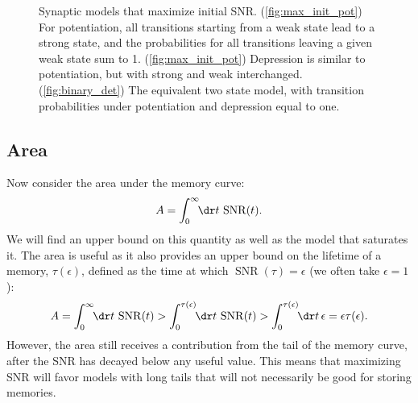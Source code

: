 \documentclass{article} %
\DeclareMathOperator{\snr}{SNR}
\begin{document}
\begin{figure}[tbp]
 \begin{center}
 \begin{myenuma}
  \item\hp{}\label{fig:max_init_pot}\hp
  \item{}\label{fig:max_init_dep}\hp
  \item\hp{}\label{fig:binary_det}
  \end{myenuma}
 \end{center}
  \caption{Synaptic models that maximize initial SNR.
  (\ref{fig:max_init_pot}) For potentiation, all transitions starting from a weak state lead to a strong state, and the probabilities for all transitions leaving a given weak state sum to 1.
  (\ref{fig:max_init_pot}) Depression is similar to potentiation, but with strong and weak interchanged.
  (\ref{fig:binary_det}) The equivalent two state model, with transition probabilities under potentiation and depression equal to one.
  }\label{fig:max_init}
\end{figure}


\subsection{Area}\label{sec:area}

Now consider the area under the memory curve:
%
\begin{equation}\label{eq:area}
  A = \int_0^\infty\!\!\dr t \, \snr(t).
\end{equation}
%
We will find an upper bound on this quantity as well as the model that saturates it.
The area is useful as it also provides an upper bound on the lifetime of a memory, $\tau(\epsilon)$, defined as the time at which $\snr(\tau)=\epsilon$ (we often take $\epsilon=1$):
%
\begin{equation}\label{eq:arealife}
  A = \int_0^\infty\!\!\dr t \, \snr(t)
    > \int_0^{\tau(\epsilon)}\!\!\dr t \, \snr(t)
    > \int_0^{\tau(\epsilon)}\!\!\dr t \, \epsilon
    = \epsilon \tau(\epsilon).
\end{equation}
%
However, the area still receives a contribution from the tail of the memory curve, after the SNR has decayed below any useful value.
This means that maximizing SNR will favor models with long tails that will not necessarily be good for storing memories.
\end{document}
